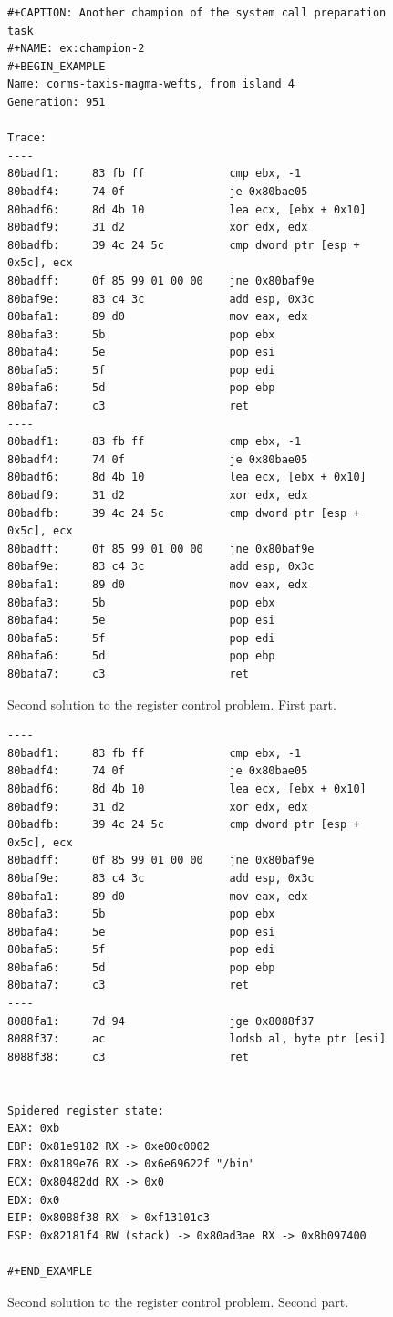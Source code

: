 \documentclass{article}
\begin{document}
\begin{figure}[ht]
\centering
\begin{verbatim}
#+CAPTION: Another champion of the system call preparation task
#+NAME: ex:champion-2
#+BEGIN_EXAMPLE
Name: corms-taxis-magma-wefts, from island 4
Generation: 951

Trace:
----
80badf1:	 83 fb ff             cmp ebx, -1
80badf4:	 74 0f                je 0x80bae05
80badf6:	 8d 4b 10             lea ecx, [ebx + 0x10]
80badf9:	 31 d2                xor edx, edx
80badfb:	 39 4c 24 5c          cmp dword ptr [esp + 0x5c], ecx
80badff:	 0f 85 99 01 00 00    jne 0x80baf9e
80baf9e:	 83 c4 3c             add esp, 0x3c
80bafa1:	 89 d0                mov eax, edx
80bafa3:	 5b                   pop ebx
80bafa4:	 5e                   pop esi
80bafa5:	 5f                   pop edi
80bafa6:	 5d                   pop ebp
80bafa7:	 c3                   ret 
----
80badf1:	 83 fb ff             cmp ebx, -1
80badf4:	 74 0f                je 0x80bae05
80badf6:	 8d 4b 10             lea ecx, [ebx + 0x10]
80badf9:	 31 d2                xor edx, edx
80badfb:	 39 4c 24 5c          cmp dword ptr [esp + 0x5c], ecx
80badff:	 0f 85 99 01 00 00    jne 0x80baf9e
80baf9e:	 83 c4 3c             add esp, 0x3c
80bafa1:	 89 d0                mov eax, edx
80bafa3:	 5b                   pop ebx
80bafa4:	 5e                   pop esi
80bafa5:	 5f                   pop edi
80bafa6:	 5d                   pop ebp
80bafa7:	 c3                   ret 
\end{verbatim}
\caption{Second solution to the register control problem. First part.}
\label{fig:rc2}
\end{figure}
\begin{figure}[ht]
\ContinuedFloat
\centering
\begin{verbatim}
----
80badf1:	 83 fb ff             cmp ebx, -1
80badf4:	 74 0f                je 0x80bae05
80badf6:	 8d 4b 10             lea ecx, [ebx + 0x10]
80badf9:	 31 d2                xor edx, edx
80badfb:	 39 4c 24 5c          cmp dword ptr [esp + 0x5c], ecx
80badff:	 0f 85 99 01 00 00    jne 0x80baf9e
80baf9e:	 83 c4 3c             add esp, 0x3c
80bafa1:	 89 d0                mov eax, edx
80bafa3:	 5b                   pop ebx
80bafa4:	 5e                   pop esi
80bafa5:	 5f                   pop edi
80bafa6:	 5d                   pop ebp
80bafa7:	 c3                   ret 
----
8088fa1:	 7d 94                jge 0x8088f37
8088f37:	 ac                   lodsb al, byte ptr [esi]
8088f38:	 c3                   ret 


Spidered register state:
EAX: 0xb
EBP: 0x81e9182 RX -> 0xe00c0002
EBX: 0x8189e76 RX -> 0x6e69622f "/bin"
ECX: 0x80482dd RX -> 0x0
EDX: 0x0
EIP: 0x8088f38 RX -> 0xf13101c3
ESP: 0x82181f4 RW (stack) -> 0x80ad3ae RX -> 0x8b097400

#+END_EXAMPLE
\end{verbatim}
\caption{Second solution to the register control problem. Second part.}
\label{fig:rc2_cont}
\end{figure}
\end{document}
